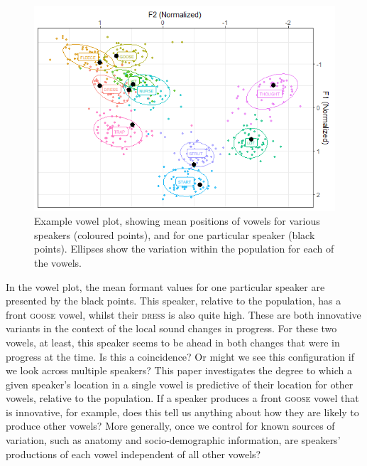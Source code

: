 \documentclass[review]{elsarticle} %
\begin{document}
\begin{figure}[!t]
\includegraphics[width=\textwidth]{Figures/examplespeaker2.png}
\caption{Example vowel plot, showing mean positions of vowels for various speakers (coloured points), and for one particular speaker (black points). Ellipses show the variation within the population for each of the vowels.}
\label{fig:speaker_example}
\end{figure}

In the vowel plot, the mean formant values for one particular speaker are presented by the black points.  This speaker, relative to the population, has a front \textsc{goose} vowel, whilst their  \textsc{dress} is also quite high.   These are both innovative variants in the context of the local sound changes in progress.  For these two vowels, at least, this speaker seems to be ahead in both changes that were in progress at the time. Is this a coincidence? Or might we see this configuration if we look across multiple speakers? This paper investigates the degree to which a given speaker’s location in a single vowel is predictive of their location for other vowels, relative to the population.   If a speaker produces a front \textsc{goose} vowel that is innovative, for example, does this tell us anything about how they are likely to produce other vowels?  More generally, once we control for known sources of variation, such as anatomy and socio-demographic information, are speakers’ productions of each vowel independent of all other vowels?
\end{document}

